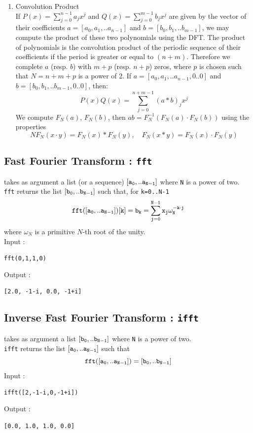 \documentclass[a4paper,11pt]{book}
\begin{document}
\begin{enumerate}
\item Convolution Product\\
If $P(x)=\sum_{j=0}^{n-1}a_jx^j$  
and $Q(x)=\sum_{j=0}^{m-1}b_jx^j$ 
are given by the vector of their coefficients 
$a=[a_0,a_1,..a_{n-1}]$ and  $b=[b_0,b_1,..b_{m-1}]$, we may
compute the product of these two polynomials using the DFT.
The product of polynomials is the convolution product 
of the periodic sequence of their coefficients 
if the period is greater or equal to  
$(n+m)$. Therefore we complete $a$ (resp. $b$) with $m+p$ 
(resp. $n+p$) zeros, where
$p$ is chosen such that $N=n+m+p$ is a power of 2.
If $a=[a_0,a_1,..a_{n-1},0..0]$ and  $b=[b_0,b_1,..b_{m-1},0..0]$, then:
\[ P(x)Q(x)=\sum_{j=0}^{n+m-1}(a*b)_jx^j \]
We compute $F_N(a)$, $F_N(b)$, then $ab=F_N^{-1}(F_N(a)\cdot F_N(b))$
using the properties
\[ NF_N(x \cdot y)=F_N(x) * F_N(y), \quad
F_N(x * y)=F_N(x) \cdot F_N(y) \]
\end{enumerate}

\subsection{Fast Fourier Transform : {\tt fft}}
 takes as argument a list (or a sequence)
${\tt [a_0,..a_{N-1}]}$ where {\tt N} is a power of two.\\
{\tt fft} returns the list ${\tt [b_0,..b_{N-1}]}$ such that, 
for {\tt k=0..N-1} 
\[ {\tt 
  {fft([a_0,..a_{N-1}])}[k]=b_k=\sum_{j=0}^{N-1}x_j\omega_N^{-k\cdot
    j}} \]
where $\omega_N$ is a primitive $N$-th root of the unity.\\
Input :
\begin{center}{\tt fft(0,1,1,0)}\end{center}
Output :
\begin{center}{\tt [2.0, -1-i, 0.0, -1+i]}\end{center}

\subsection{Inverse Fast Fourier Transform : {\tt ifft}}
 takes as argument a list ${\tt [b_0,..b_{N-1}]}$ where
{\tt N} is a power of two.\\
{\tt ifft} returns the list ${\tt [a_0,..a_{N-1}]}$ such that
\[ {\tt fft([a_0,..a_{N-1}])=[b_0,..b_{N-1}]} \]
Input :
\begin{center}{\tt ifft([2,-1-i,0,-1+i])}\end{center}
Output :
\begin{center}{\tt [0.0, 1.0, 1.0, 0.0]}\end{center}
\end{document}
